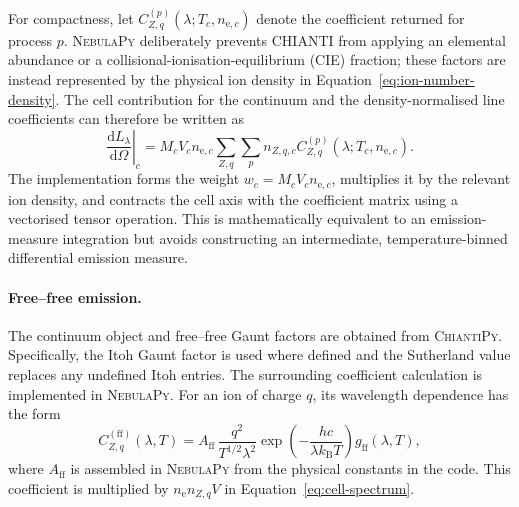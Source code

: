 For compactness, let
$C^{(p)}_{Z,q}(\lambda;T_c,n_{\mathrm e,c})$ denote the coefficient returned
for process $p$.  \textsc{NebulaPy} deliberately prevents CHIANTI from applying
an elemental abundance or a collisional-ionisation-equilibrium (CIE) fraction;
these factors are instead represented by the physical ion density in
Equation~\eqref{eq:ion-number-density}.  The cell contribution for the
continuum and the density-normalised line coefficients can therefore be
written as
\begin{equation}
  \left.\frac{\mathrm dL_\lambda}{\mathrm d\Omega}\right|_c
  = M_c V_c n_{\mathrm e,c}
    \sum_{Z,q}\sum_p n_{Z,q,c}
    C^{(p)}_{Z,q}(\lambda;T_c,n_{\mathrm e,c}).
  \label{eq:cell-spectrum}
\end{equation}
The implementation forms the weight
$w_c=M_cV_cn_{\mathrm e,c}$, multiplies it by the relevant ion density, and
contracts the cell axis with the coefficient matrix using a vectorised tensor
operation.  This is mathematically equivalent to an emission-measure
integration but avoids constructing an intermediate, temperature-binned
differential emission measure.

\paragraph{Free--free emission.}
The continuum object and free--free Gaunt factors are obtained from
\textsc{ChiantiPy}.  Specifically, the Itoh Gaunt factor is used where defined
and the Sutherland value replaces any undefined Itoh entries.  The surrounding
coefficient calculation is implemented in \textsc{NebulaPy}.  For an ion of
charge $q$, its wavelength dependence has the form
\begin{equation}
  C^{(\mathrm{ff})}_{Z,q}(\lambda,T)
  = A_{\mathrm{ff}}\,
    \frac{q^2}{T^{1/2}\lambda^2}
    \exp\!\left(-\frac{hc}{\lambda k_{\mathrm B}T}\right)
    g_{\mathrm{ff}}(\lambda,T),
  \label{eq:free-free}
\end{equation}
where $A_{\mathrm{ff}}$ is assembled in \textsc{NebulaPy} from the physical
constants in the code.  This coefficient is multiplied by
$n_{\mathrm e}n_{Z,q}V$ in Equation~\eqref{eq:cell-spectrum}.

